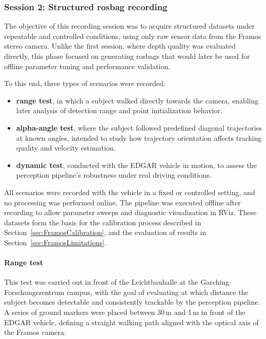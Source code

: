 \subsubsection{Session 2: Structured rosbag recording}
\label{sec:FramosRosbagRecording}



The objective of this recording session was to acquire structured datasets 
under repeatable and controlled conditions, using only raw sensor data from 
the Framos stereo camera. Unlike the first session, where depth quality was 
evaluated directly, this phase focused on generating rosbags that would later 
be used for offline parameter tuning and performance validation.

To this end, three types of scenarios were recorded:
\begin{itemize}
  \item \textbf{range test}, in which a subject walked directly towards the 
        camera, enabling later analysis of detection range and point 
        initialization behavior.
  \item \textbf{alpha-angle test}, where the subject followed predefined 
        diagonal trajectories at known angles, intended to study how trajectory 
        orientation affects tracking quality and velocity estimation.
  \item \textbf{dynamic test}, conducted with the EDGAR vehicle in motion, 
        to assess the perception pipeline's robustness under real driving 
        conditions.
\end{itemize}

All scenarios were recorded with the vehicle in a fixed or controlled setting, 
and no processing was performed online. The pipeline was executed offline after 
recording to allow parameter sweeps and diagnostic visualization in RViz. 
These datasets form the basis for the calibration process described in 
Section~\ref{sec:FramosCalibration}, and the evaluation of results in 
Section~\ref{sec:FramosLimitations}. \paragraph{Range test}
\label{sec:FramosRangeTest}

This test was carried out in front of the Leichtbauhalle at the Garching 
Forschungszentrum campus, with the goal of evaluating at which distance 
the subject becomes detectable and consistently trackable by the perception 
pipeline. A series of ground markers were placed between 30\,m and 1\,m in 
front of the EDGAR vehicle, defining a straight walking path aligned with 
the optical axis of the Framos camera.

